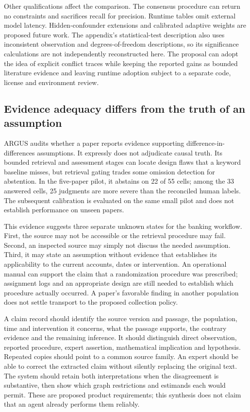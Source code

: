 Other qualifications affect the comparison. The consensus procedure can
return no constraints and sacrifices recall for precision. Runtime
tables omit external model latency. Hidden-confounder extensions and
calibrated adaptive weights are proposed future work. The appendix's
statistical-test description also uses inconsistent observation and
degrees-of-freedom descriptions, so its significance calculations are
not independently reconstructed here. The proposal can adopt the idea of
explicit conflict traces while keeping the reported gains as bounded
literature evidence and leaving runtime adoption subject to a separate
code, license and environment review.
\citep{exec14_expert_argumentation}

\hypertarget{evidence-adequacy-differs-from-the-truth-of-an-assumption}{%
\subsection{Evidence adequacy differs from the truth of an
assumption}\label{evidence-adequacy-differs-from-the-truth-of-an-assumption}}

ARGUS audits whether a paper reports evidence supporting
difference-in-differences assumptions. It expressly does not adjudicate
causal truth. Its bounded retrieval and assessment stages can locate
design flaws that a keyword baseline misses, but retrieval gating trades
some omission detection for abstention. In the five-paper pilot, it
abstains on 22 of 55 cells; among the 33 answered cells, 25 judgments
are more severe than the reconciled human labels. The subsequent
calibration is evaluated on the same small pilot and does not establish
performance on unseen papers. \citep{v12_la_2609_30867}

This evidence suggests three separate unknown states for the banking
workflow. First, the source may not be accessible or the retrieval
procedure may fail. Second, an inspected source may simply not discuss
the needed assumption. Third, it may state an assumption without
evidence that establishes its applicability to the current accounts,
dates or intervention. An operational manual can support the claim that
a randomization procedure was prescribed; assignment logs and an
appropriate design are still needed to establish which procedure
actually occurred. A paper's favorable finding in another population
does not settle transport to the proposed collection policy.

A claim record should identify the source version and passage, the
population, time and intervention it concerns, what the passage
supports, the contrary evidence and the remaining inference. It should
distinguish direct observation, reported procedure, expert assertion,
mathematical implication and hypothesis. Repeated copies should point to
a common source family. An expert should be able to correct the
extracted claim without silently replacing the original text. The system
should retain both interpretations when the disagreement is substantive,
then show which graph restrictions and estimands each would permit.
These are proposed product requirements; this synthesis does not claim
that an agent already performs them reliably.

